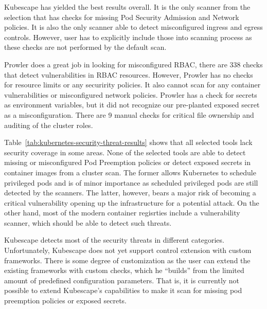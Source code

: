 Kubescape has yielded the best results overall. It is the only scanner from the selection that has checks for missing Pod Security Admission and Network policies. It is also the only scanner able to detect misconfigured ingress and egress controls. However, user has to explicitly include those into scanning process as these checks are not performed by the default scan.

Prowler does a great job in looking for misconfigured RBAC, there are 338 checks that detect vulnerabilities in RBAC resources. However, Prowler has no checks for resource limits or any securirity policies. It also cannot scan for any container vulnerabilities or misconfigured network policies. Prowler has a check for secrets as environment variables, but it did not recognize our pre-planted exposed secret as a misconfiguration. There are 9 manual checks for critical file ownership and auditing of the cluster roles.

Table~\ref{tab:kubernetes-security-threat-results} shows that all selected tools lack security coverage in some areas. None of the selected tools are able to detect missing or misconfigured Pod Preemption policies or detect exposed secrets in container images from a cluster scan. The former allows Kubernetes to schedule privileged pods and is of minor importance as scheduled privileged pods are still detected by the scanners. The latter, however, bears a major risk of becoming a critical vulnerability opening up the infrastructure for a potential attack. On the other hand, most of the modern container regisrties include a vulnerability scanner, which should be able to detect such threats.

Kubescape detects most of the security threats in different categories. Unfortunately, Kubescape does not yet support control extension with custom frameworks. There is some degree of customization as the user can extend the existing frameworks with custom checks, which he ``builds'' from the limited amount of predefined configuration parameters. That is, it is currently not possible to extend Kubescape's capabilities to make it scan for missing pod preemption policies or exposed secrets.

